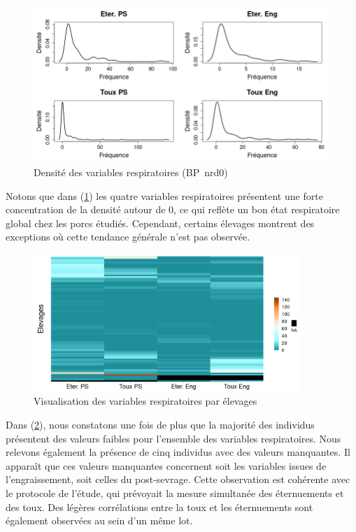 \documentclass{article}
\begin{document}
\begin{figure}[H]
    \centering
    \includegraphics[width=\textwidth]{img_var_resp/dens_var_resp.png}
    \caption{Densité des variables respiratoires (BP\protect\footnotemark\ \text{: }nrd0\protect\footnotemark)}\label{fig:dens_resp}
\end{figure}

\addtocounter{footnote}{-1}
\addtocounter{footnote}{1}

Notons que dans (\ref{fig:dens_resp}) les quatre variables respiratoires présentent une forte concentration de la densité autour de 0, ce qui reflète un bon état respiratoire global chez les porcs étudiés. Cependant, certains élevages montrent des exceptions où cette tendance générale n'est pas observée.

\begin{figure}[H]
    \centering
    \includegraphics[width=0.9\textwidth]{img_var_resp/rep_var_resp.png}
    \caption{Visualisation des variables respiratoires par élevages}\label{fig:rep_resp}
\end{figure}
Dans (\ref{fig:rep_resp}), nous constatons une fois de plus que la majorité des individus présentent des valeurs faibles pour l'ensemble des variables respiratoires. Nous relevons également la présence de cinq individus avec des valeurs manquantes. Il apparaît que ces valeurs manquantes concernent soit les variables issues de l'engraissement, soit celles du post-sevrage. Cette observation est cohérente avec le protocole de l'étude, qui prévoyait la mesure simultanée des éternuements et des toux.
Des légères corrélations entre la toux et les éternuements sont également observées au sein d'un même lot.
\end{document}
